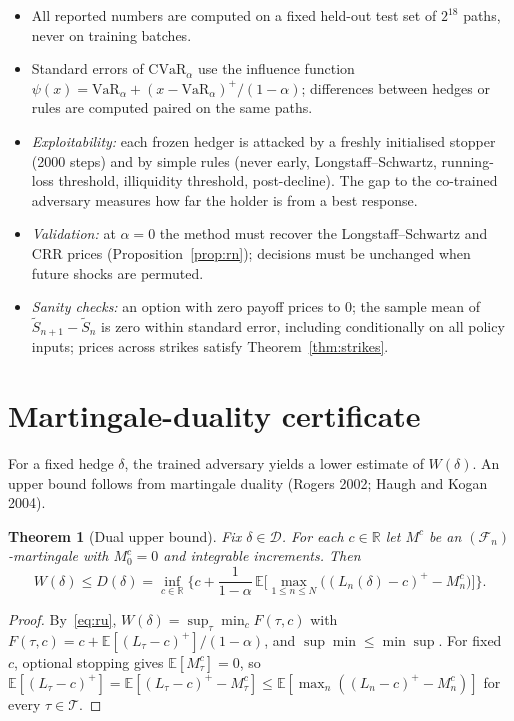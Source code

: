\documentclass[11pt]{article}
\newtheorem{theorem}{Theorem}
\theoremstyle{definition}
\theoremstyle{remark}
\newcommand{\E}{\mathbb{E}}
\newcommand{\F}{\mathcal{F}}
\newcommand{\T}{\mathcal{T}}
\newcommand{\D}{\mathcal{D}}
\newcommand{\CVaR}{\mathrm{CVaR}}
\newcommand{\VaR}{\mathrm{VaR}}
\newcommand{\St}{\tilde S}
\begin{document}
\begin{itemize}[leftmargin=*]
\item All reported numbers are computed on a fixed held-out test set of $2^{18}$ paths, never on training
  batches.
\item Standard errors of $\CVaR_\alpha$ use the influence function
  $\psi(x)=\VaR_\alpha+(x-\VaR_\alpha)^+/(1-\alpha)$; differences between hedges or rules are computed
  paired on the same paths.
\item \emph{Exploitability:} each frozen hedger is attacked by a freshly initialised stopper (2000 steps)
  and by simple rules (never early, Longstaff--Schwartz, running-loss threshold, illiquidity threshold,
  post-decline). The gap to the co-trained adversary measures how far the holder is from a best response.
\item \emph{Validation:} at $\alpha=0$ the method must recover the Longstaff--Schwartz and CRR prices
  (Proposition~\ref{prop:rn}); decisions must be unchanged when future shocks are permuted.
\item \emph{Sanity checks:} an option with zero payoff prices to $0$; the sample mean of
  $\St_{n+1}-\St_n$ is zero within standard error, including conditionally on all policy inputs; prices
  across strikes satisfy Theorem~\ref{thm:strikes}.
\end{itemize}

\section{Martingale-duality certificate}\label{sec:dual}

For a fixed hedge $\delta$, the trained adversary yields a lower estimate of $W(\delta)$. An upper bound
follows from martingale duality (Rogers 2002; Haugh and Kogan 2004).

\begin{theorem}[Dual upper bound]\label{thm:dual}
Fix $\delta\in\D$. For each $c\in\mathbb R$ let $M^c$ be an $(\F_n)$-martingale with $M^c_0=0$ and integrable
increments. Then
\[
W(\delta)\le D(\delta)=\inf_{c\in\mathbb R}\Big\{c+\frac{1}{1-\alpha}\,
\E\Big[\max_{1\le n\le N}\big((L_n(\delta)-c)^+-M^c_n\big)\Big]\Big\}.
\]
\end{theorem}
\begin{proof}
By~\eqref{eq:ru}, $W(\delta)=\sup_\tau\min_c F(\tau,c)$ with $F(\tau,c)=c+\E[(L_\tau-c)^+]/(1-\alpha)$,
and $\sup\min\le\min\sup$. For fixed $c$, optional stopping gives $\E[M^c_\tau]=0$, so
$\E[(L_\tau-c)^+]=\E[(L_\tau-c)^+-M^c_\tau]\le\E[\max_n((L_n-c)^+-M^c_n)]$ for every $\tau\in\T$.
\end{proof}
\end{document}

